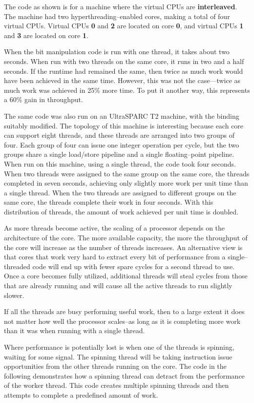 \documentclass[12pt,a4paper]{report}
\begin{document}
The code as shown is for a machine where the virtual CPUs are \textbf{interleaved}. The machine had two hyperthreading--enabled cores, making a total of four virtual CPUs. Virtual CPUs \textbf{0} and \textbf{2} are located on core \textbf{0}, and virtual CPUs \textbf{1} and \textbf{3} are located on core \textbf{1}.
\par
When the bit manipulation code is run with one thread, it takes about two seconds. When run with two threads on the same core, it runs in two and a half seconds. If the runtime had remained the same, then twice as much work would have been achieved in the same time. However, this was not the case---twice as much work was achieved in 25\% more time. To put it another way, this represents a 60\% gain in throughput.
\par
The same code was also run on an UltraSPARC T2 machine, with the binding suitably modified. The topology of this machine is interesting because each core can support eight threads, and these threads are arranged into two groups of four. Each group of four can issue one integer operation per cycle, but the two groups share a single load/store pipeline and a single floating--point pipeline. When run on this machine, using a single thread, the code took four seconds. When two threads were assigned to the same group on the same core, the threads completed in seven seconds, achieving only slightly more work per unit time than a single thread. When the two threads are assigned to different groups on the same core, the threads complete their work in four seconds. With this distribution of threads, the amount of work achieved per unit time is doubled.
\par
As more threads become active, the scaling of a processor depends on the architecture of the core. The more available capacity, the more the throughput of the core will increase as the number of threads increases. An alternative view is that cores that work very hard to extract every bit of performance from a single--threaded code will end up with fewer spare cycles for a second thread to use. Once a core becomes fully utilized, additional threads will steal cycles from those that are already running and will cause all the active threads to run slightly slower.
\par
If all the threads are busy performing useful work, then to a large extent it does not matter how well the processor scales--as long as it is completing more work than it was when running with a single thread.
\par
Where performance is potentially lost is when one of the threads is spinning, waiting for some signal. The spinning thread will be taking instruction issue opportunities from the other threads running on the core. The code in the following demonstrates how a spinning thread can detract from the performance of the worker thread. This code creates multiple spinning threads and then attempts to complete a predefined amount of work.
\end{document}
